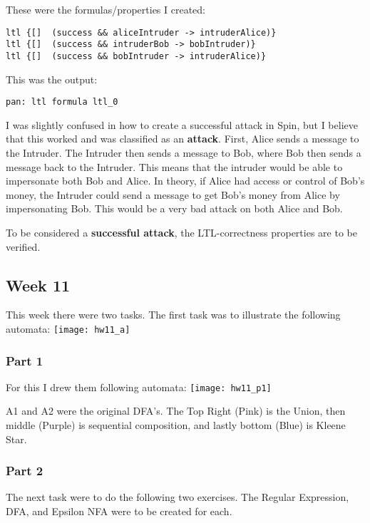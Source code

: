 \documentclass{article}
\theoremstyle{theorem}
\theoremstyle{definition}
\theoremstyle{remark}
\begin{document}
\noindent\newline These were the formulas/properties I created:
\begin{verbatim}
ltl {[]  (success && aliceIntruder -> intruderAlice)}
ltl {[]  (success && intruderBob -> bobIntruder)}
ltl {[]  (success && bobIntruder -> intruderAlice)}
\end{verbatim}

\noindent\newline This was the output:
\begin{verbatim}
pan: ltl formula ltl_0
\end{verbatim}

\noindent\newline I was slightly confused in how to create a successful attack in Spin, but I believe that this worked and was classified as an \textbf{attack}. First, Alice sends a message to the Intruder. The Intruder then sends a message to Bob, where Bob then sends a message back to the Intruder. This means that the intruder would be able to impersonate both Bob and Alice. In theory, if Alice had access or control of Bob's money, the Intruder could send a message to get Bob's money from Alice by impersonating Bob. This would be a very bad attack on both Alice and Bob.


\noindent\newline To be considered a \textbf{successful attack}, the LTL-correctness properties are to be verified.

\subsection{Week 11}
This week there were two tasks. The first task was to illustrate the following automata:\newline
\texttt{[image: hw11\_a]}

\subsubsection{Part 1}
\noindent\newline For this I drew them following automata:\newline
\texttt{[image: hw11\_p1]}

\noindent\newline A1 and A2 were the original DFA's. The Top Right (Pink) is the Union, then middle (Purple) is sequential composition, and lastly bottom (Blue) is Kleene Star.

\subsubsection{Part 2}
\noindent\newline The next task were to do the following two exercises. The Regular Expression, DFA, and Epsilon NFA were to be created for each.
\end{document}
